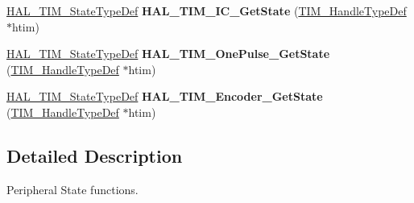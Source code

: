 \begin{DoxyCompactItemize}
\mbox{\hyperlink{group___t_i_m___exported___types_gae0994cf5970e56ca4903e9151f40010c}{H\+A\+L\+\_\+\+T\+I\+M\+\_\+\+State\+Type\+Def}} {\bfseries H\+A\+L\+\_\+\+T\+I\+M\+\_\+\+I\+C\+\_\+\+Get\+State} (\mbox{\hyperlink{struct_t_i_m___handle_type_def}{T\+I\+M\+\_\+\+Handle\+Type\+Def}} $\ast$htim)
\item 
\mbox{\label{group___t_i_m___exported___functions___group10_gab66fcfc1ee00512f50ef56f4397a0e9f}} 
\mbox{\hyperlink{group___t_i_m___exported___types_gae0994cf5970e56ca4903e9151f40010c}{H\+A\+L\+\_\+\+T\+I\+M\+\_\+\+State\+Type\+Def}} {\bfseries H\+A\+L\+\_\+\+T\+I\+M\+\_\+\+One\+Pulse\+\_\+\+Get\+State} (\mbox{\hyperlink{struct_t_i_m___handle_type_def}{T\+I\+M\+\_\+\+Handle\+Type\+Def}} $\ast$htim)
\item 
\mbox{\label{group___t_i_m___exported___functions___group10_ga1925971e419b85db7fed57919ba765ef}} 
\mbox{\hyperlink{group___t_i_m___exported___types_gae0994cf5970e56ca4903e9151f40010c}{H\+A\+L\+\_\+\+T\+I\+M\+\_\+\+State\+Type\+Def}} {\bfseries H\+A\+L\+\_\+\+T\+I\+M\+\_\+\+Encoder\+\_\+\+Get\+State} (\mbox{\hyperlink{struct_t_i_m___handle_type_def}{T\+I\+M\+\_\+\+Handle\+Type\+Def}} $\ast$htim)
\end{DoxyCompactItemize}


\subsection{Detailed Description}
Peripheral State functions. 

